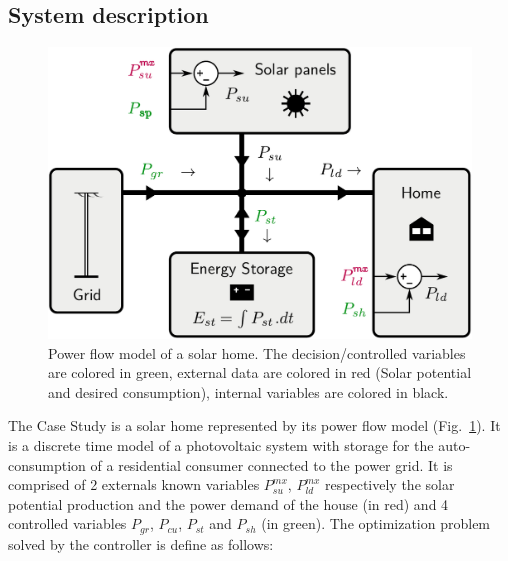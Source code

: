 \documentclass{ifacconf}
\begin{document}
\subsection{System description}
\begin{figure}[!ht]
        \begin{center}
                \includegraphics[width=0.9\columnwidth]{Figures/solar_home2.pdf}
        \end{center}

        \caption{Power flow model of a solar home.
        The decision/controlled variables are colored in green, external data are colored in red (Solar potential and desired consumption), internal variables are colored in black.
        }
        \label{fig:solhome}
\end{figure}
\quad The Case Study is a solar home represented by its power flow model (Fig.~\ref{fig:solhome}). It is a discrete time model of a photovoltaic system with storage for the auto-consumption of a residential consumer connected to the power grid. It is comprised of 2 externals known variables $P_{su}^{mx}$, $P_{ld}^{mx}$ respectively the solar potential production  and the power demand of the house (in red) and 4 controlled variables $P_{gr}$, $P_{cu}$, $P_{st}$ and $P_{sh}$ (in green). The optimization problem solved by the controller is define as follows: 
\end{document}
